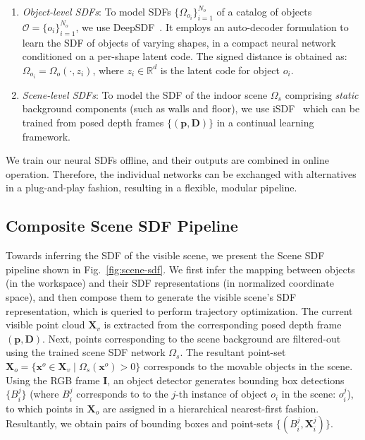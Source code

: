 \documentclass[letterpaper, 10 pt, conference]{ieeeconf}  %
\begin{document}
\begin{enumerate}
    \item \emph{Object-level SDFs}:
    To model SDFs $\{ \Omega_{o_i} \}_{i=1}^{N_o}$ of a catalog of objects $\mathcal{O} = \{o_i\}_{i=1}^{N_o}$, we use DeepSDF~\cite{deepsdf19}.
    It employs an auto-decoder formulation to learn the SDF of objects of varying shapes, in a compact neural network conditioned on a per-shape latent code.
    The signed distance is obtained as: $\Omega_{o_i} = \Omega_o (\cdot, z_i)$, where $z_i \in \mathbb{R}^d$ is the latent code for object $o_i$.
    \item \emph{Scene-level SDFs}:
    To model the SDF of the indoor scene $\Omega_s$ comprising \emph{static} background components (such as walls and floor), we use iSDF~\cite{isdf22} which can be trained from posed depth frames $\{(\mathbf{p}, \mathbf{D})\}$ in a continual learning framework.
\end{enumerate}

\noindent We train our neural SDFs offline, and their outputs are combined in online operation.
Therefore, the individual networks can be exchanged with alternatives in a plug-and-play fashion, resulting in a flexible, modular pipeline.

\subsection{\label{ssec:scene-sdf}Composite Scene SDF Pipeline}

Towards inferring the SDF of the visible scene, we present the Scene SDF pipeline shown in Fig.~\ref{fig:scene-sdf}.
We first infer the mapping between objects (in the workspace) and their SDF representations (in normalized coordinate space), and then compose them to generate the visible scene's SDF representation, which is queried to perform trajectory optimization.
The current visible point cloud $\mathbf{X}_v$ is extracted from the corresponding posed depth frame $(\mathbf{p}, \mathbf{D})$.
Next, points corresponding to the scene background are filtered-out using the trained scene SDF network $\Omega_s$.
The resultant point-set $\mathbf{X}_o = \{ \mathbf{x}^o \in \mathbf{X}_v \mid \Omega_s(\mathbf{x}^o) > 0 \}$ corresponds to the movable objects in the scene.
Using the RGB frame $\mathbf{I}$, an object detector generates bounding box detections $\{B_i^j\}$ (where $B_i^j$ corresponds to to the $j$-th instance of object $o_i$ in the scene: $o_i^j$), to which points in $\mathbf{X}_o$ are assigned in a hierarchical nearest-first fashion.
Resultantly, we obtain pairs of bounding boxes and point-sets $\{(B_i^j, \mathbf{X}_i^j)\}$.
\end{document}
